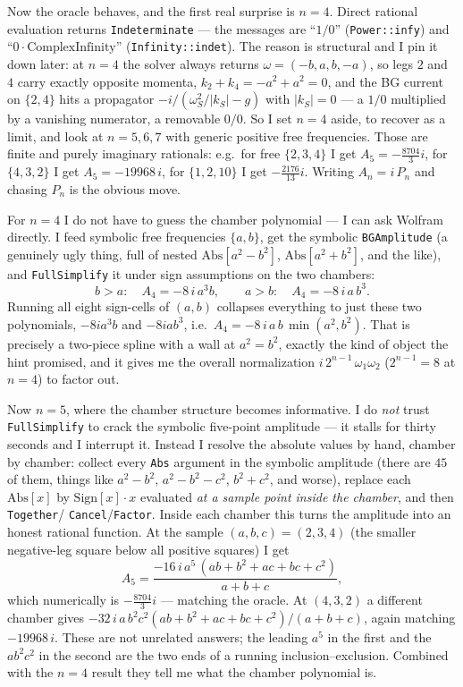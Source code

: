 \documentclass{article}
\begin{document}
Now the oracle behaves, and the first real surprise is $n=4$. Direct rational
evaluation returns \texttt{Indeterminate} --- the messages are ``$1/0$''
(\texttt{Power::infy}) and ``$0\cdot\text{ComplexInfinity}$''
(\texttt{Infinity::indet}). The reason is structural and I pin it down later: at
$n=4$ the solver always returns $\omega=(-b,a,b,-a)$, so legs $2$ and $4$ carry
exactly opposite momenta, $k_2+k_4=-a^2+a^2=0$, and the BG current on $\{2,4\}$
hits a propagator $-i/(\omega_S^2/|k_S|-g)$ with $|k_S|=0$ --- a $1/0$ multiplied
by a vanishing numerator, a removable $0/0$. So I set $n=4$ aside, to recover as a
limit, and look at $n=5,6,7$ with generic positive free frequencies. Those are
finite and purely imaginary rationals: e.g.\ for free $\{2,3,4\}$ I get
$A_5=-\tfrac{8704}{3}i$, for $\{4,3,2\}$ I get $A_5=-19968\,i$, for $\{1,2,10\}$
I get $-\tfrac{2176}{13}i$. Writing $A_n=i\,P_n$ and chasing $P_n$ is the obvious
move.

For $n=4$ I do not have to guess the chamber polynomial --- I can ask Wolfram
directly. I feed symbolic free frequencies $\{a,b\}$, get the symbolic
\texttt{BGAmplitude} (a genuinely ugly thing, full of nested
$\mathrm{Abs}[a^2-b^2]$, $\mathrm{Abs}[a^2+b^2]$, and the like), and
\texttt{FullSimplify} it under sign assumptions on the two chambers:
\[
b>a:\quad A_4=-8\,i\,a^3 b,\qquad a>b:\quad A_4=-8\,i\,a\,b^3 .
\]
Running all eight sign-cells of $(a,b)$ collapses everything to just these two
polynomials, $-8ia^3b$ and $-8iab^3$, i.e.\
$A_4=-8\,i\,a\,b\,\min(a^2,b^2)$. That is precisely a two-piece spline with a
wall at $a^2=b^2$, exactly the kind of object the hint promised, and it gives me
the overall normalization $i\,2^{n-1}\,\omega_1\omega_2$ ($2^{n-1}=8$ at $n=4$)
to factor out.

Now $n=5$, where the chamber structure becomes informative. I do \emph{not} trust
\texttt{FullSimplify} to crack the symbolic five-point amplitude --- it stalls for
thirty seconds and I interrupt it. Instead I resolve the absolute values by hand,
chamber by chamber: collect every \texttt{Abs} argument in the symbolic amplitude
(there are $45$ of them, things like $a^2-b^2$, $a^2-b^2-c^2$, $b^2+c^2$, and
worse), replace each $\mathrm{Abs}[x]$ by $\mathrm{Sign}[x]\cdot x$ evaluated
\emph{at a sample point inside the chamber}, and then \texttt{Together}/%
\texttt{Cancel}/\texttt{Factor}. Inside each chamber this turns the amplitude into
an honest rational function. At the sample $(a,b,c)=(2,3,4)$ (the smaller
negative-leg square below all positive squares) I get
\[
A_5=\frac{-16\,i\,a^5\,(ab+b^2+ac+bc+c^2)}{a+b+c},
\]
which numerically is $-\tfrac{8704}{3}i$ --- matching the oracle. At
$(4,3,2)$ a different chamber gives
$-32\,i\,a\,b^2c^2(ab+b^2+ac+bc+c^2)/(a+b+c)$, again matching $-19968\,i$. These
are not unrelated answers; the leading $a^5$ in the first and the $ab^2c^2$ in the
second are the two ends of a running inclusion--exclusion. Combined with the
$n=4$ result they tell me what the chamber polynomial is.
\end{document}
